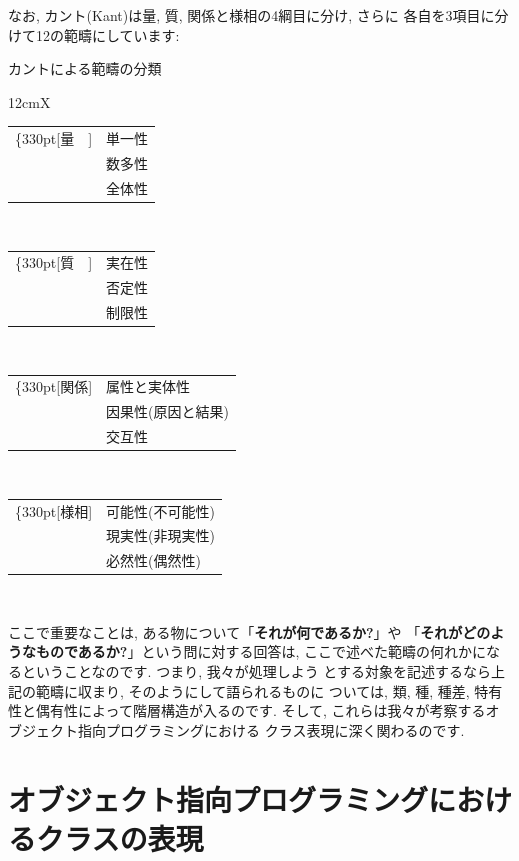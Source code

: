 なお, カント(Kant)は量, 質, 関係と様相の4綱目に分け, さらに
各自を3項目に分けて12の範疇にしています:


\begin{itembox}[c]{カントによる範疇の分類}
{\footnotesize
\begin{tabularx}{12cm}{X}
\begin{tabular}[t]{rl}
\ldelim\{{3}{30pt}[量　]&
単一性\\
&数多性\\
&全体性\\
\end{tabular}
\\
\begin{tabular}[t]{rl}
\ldelim\{{3}{30pt}[質　]&
実在性\\
&否定性\\
&制限性\\
\end{tabular}
\\
\begin{tabular}[t]{rl}
\ldelim\{{3}{30pt}[関係]&
属性と実体性\\
&因果性(原因と結果)\\
&交互性\\
\end{tabular}
\\
\begin{tabular}[t]{rl}
\ldelim\{{3}{30pt}[様相]&
可能性(不可能性)\\
&現実性(非現実性)\\
&必然性(偶然性)\\
\end{tabular}
\\
\end{tabularx}
}
\end{itembox}


ここで重要なことは, ある物について「\textbf{それが何であるか?}」や
「\textbf{それがどのようなものであるか?}」という問に対する回答は,
 ここで述べた範疇の何れかになるということなのです. つまり, 我々が処理しよう
とする対象を記述するなら上記の範疇に収まり, そのようにして語られるものに
ついては, 類, 種, 種差, 特有性と偶有性によって階層構造が入るのです.
 そして, これらは我々が考察するオブジェクト指向プログラミングにおける
クラス表現に深く関わるのです.

\section{オブジェクト指向プログラミングにおけるクラスの表現}



